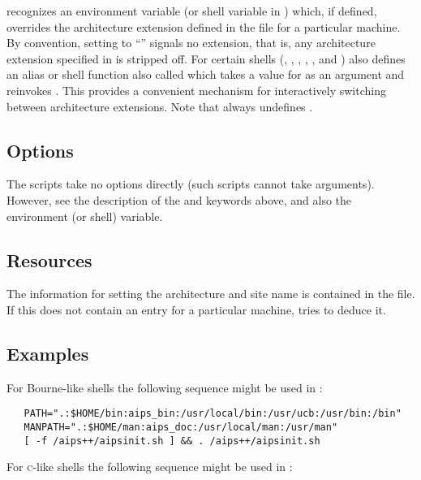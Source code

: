  recognizes an environment variable (or shell variable in
)  which, if defined, overrides the
architecture extension defined in the  file for a particular
machine.  By convention, setting  to ``\code{\_}'' signals no
extension, that is, any architecture extension specified in 
is stripped off.  For certain shells (, ,
, , , and ) 
also defines an alias or shell function also called  which takes
a value for  as an argument and reinvokes .
This provides a convenient mechanism for interactively switching between
architecture extensions.  Note that  always undefines
.


\subsection*{Options}

The  scripts take no options directly (such scripts cannot take
arguments).  However, see the description of the  and
 keywords above, and also the  environment (or
shell) variable.


\subsection*{Resources}

The information for setting the architecture and site name is contained in the
 file.  If this does not contain an entry for a particular
machine,  tries to deduce it.

\subsection*{Examples}

\noindent
For Bourne-like shells the following sequence might be used in
:

\begin{verbatim}
   PATH=".:$HOME/bin:aips_bin:/usr/local/bin:/usr/ucb:/usr/bin:/bin"
   MANPATH=".:$HOME/man:aips_doc:/usr/local/man:/usr/man"
   [ -f /aips++/aipsinit.sh ] && . /aips++/aipsinit.sh
\end{verbatim}

\noindent
For \textsc{c}-like shells the following sequence might be used in
:

